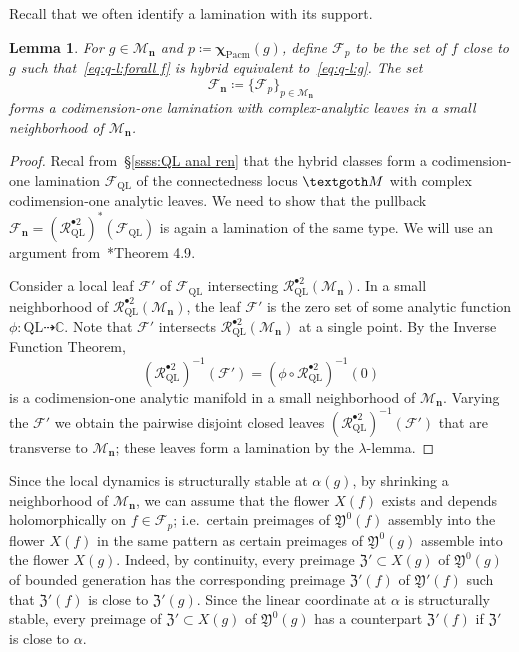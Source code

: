 \documentclass{amsart}
\newcommand{\1}{{\mathbb 1 }}
\newcommand{\Mandel}{{\mathcal{M}}}
\newcommand\MM{\mathscr{M}}
\newcommand\RR{\mathcal{R}}
\newcommand\frakY{{\mathfrak Y}}
\newcommand\frakZ{{\mathfrak Z}}
\newcommand{\bbn}{{\mathbf n}}
\newcommand\strai{{\boldsymbol \chi}}
\newcommand\Pacm{{\operatorname{Pacm}}}
\newcommand{\C}{\mathbb{C}}
\newcommand{\Fol}{{\mathcal F}}
\newcommand{\bFol}{{\boldsymbol{ \mathcal F}}}
\newtheorem{lem}[thm]{Lemma}
\theoremstyle{remark}
\numberwithin{equation}{section}
\theoremstyle{definition}
\def\QL{{\text{QL}}}
\newcommand{\Conn}{{\textgoth M}}
\theoremstyle{nonumberbreak}
\begin{document}
 Recall that we often identify a lamination with its support.
 \begin{lem}
 \label{lem:Foliat}
 For $g\in \MM_\bbn$ and $p\coloneqq \strai_{\Pacm}(g)$, 
define $\Fol_{p}$ to be the set of $f$ close to $g$ such that~\eqref{eq:q-l:forall f} is hybrid equivalent to~\eqref{eq:q-l:g}.
 The set  
  \[\bFol_\bbn\coloneqq \{\Fol_{p}\}_{p\in \Mandel_\bbn}\]
 forms a codimension-one lamination with complex-analytic leaves in a small neighborhood of $\MM_\bbn$.
 \end{lem}
\begin{proof}
Recal from~\S\ref{ssss:QL anal ren} that the hybrid classes form a codimension-one lamination $\bFol_{\QL}$ of the connectedness locus $\Conn$ with complex codimension-one analytic leaves. We need to show that the pullback $\bFol_\bbn=\left(\RR_{\QL}^{\bullet 2}\right)^*\left(\bFol_{\QL} \right)$ is again a lamination of the same type. We will use an argument from~\cite{ALM}*{Theorem 4.9}.

Consider a local leaf $\Fol'$ of $\bFol_\QL$ intersecting $\RR_{\QL}^{\bullet 2}(\MM_\bbn)$. In a small neighborhood of  $\RR_{\QL}^{\bullet 2}(\MM_\bbn)$, the leaf $\Fol'$ is the zero set of some analytic function $\phi\colon \QL\dashrightarrow \C$. Note that $\Fol'$ intersects $\RR_{\QL}^{\bullet 2}(\MM_\bbn)$ at a single point. By the Inverse Function Theorem, 
\[\left(\RR_{\QL} ^{\bullet 2} \right)^{-1}(\Fol')= (\phi\circ \RR_{\QL}^{\bullet 2})^{-1}(0)\]
is a codimension-one analytic manifold in a small neighborhood of $\MM_\bbn$. Varying the $\Fol'$ we obtain the pairwise disjoint closed leaves $\left(\RR_{\QL} ^{\bullet 2} \right)^{-1}(\Fol')$ that are transverse to $\MM_\bbn$; these leaves form a lamination by the $\lambda$-lemma.
\end{proof} 
 
 
    Since the local dynamics is structurally stable at $\alpha(g)$, by shrinking a neighborhood of $\MM_\bbn$, we can assume that the flower $X(f)$ exists and depends holomorphically on $f\in \Fol_{p}$; i.e.~certain preimages of $\frakY^0(f)$ assembly into the flower $X(f)$ in the same pattern as certain preimages of $\frakY^0(g)$ assemble into the flower $X(g)$. Indeed, by continuity, every preimage $\frakZ'\subset X(g)$ of $\frakY^0(g)$ of bounded generation has the corresponding preimage $\frakZ'(f)$ of $\frakY'(f)$ such that $\frakZ'(f)$ is close to $\frakZ'(g)$. Since the linear coordinate at $\alpha$ is structurally stable, every preimage of $\frakZ'\subset X(g)$ of $\frakY^0(g)$ has a counterpart $\frakZ'(f)$ if $\frakZ'$ is close to $\alpha$.
    
\end{document}
